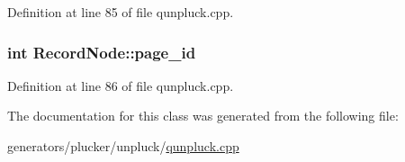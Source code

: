 Definition at line 85 of file qunpluck.\+cpp.

\hypertarget{classRecordNode_a2d55d8075e219111e55c8740707f562c}{
\subsubsection[{page\+\_\+id}]{\setlength{\rightskip}{0pt plus 5cm}int Record\+Node\+::page\+\_\+id}}\label{classRecordNode_a2d55d8075e219111e55c8740707f562c}


Definition at line 86 of file qunpluck.\+cpp.



The documentation for this class was generated from the following file\+:\begin{DoxyCompactItemize}
\item 
generators/plucker/unpluck/\hyperlink{qunpluck_8cpp}{qunpluck.\+cpp}\end{DoxyCompactItemize}
